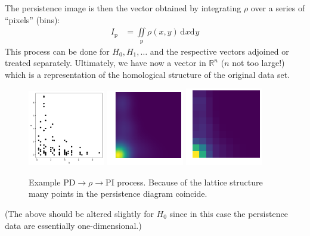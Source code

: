\documentclass[11pt]{article}
\renewcommand{\d}[2][]{\mathrm{d}^{#1}{#2}}
\begin{document}
The persistence image is then the vector obtained by integrating $\rho$ over a series of ``pixels'' (bins):
\begin{align}
    I_\text{p} &= \iint\limits_\text{p}\rho(x,y)\,\d{x}\d{y}
\end{align}
This process can be done for $H_0,H_1,\ldots$ and the respective vectors adjoined or treated separately. Ultimately, we have now a vector in $\mathbb{R}^n$ ($n$ not too large!) which is a representation of the homological structure of the original data set.

\begin{figure}[t]
    \centering
    \includegraphics[width=0.3\textwidth]{pd_example}
    \includegraphics[width=0.3\textwidth]{rho_example}
    \includegraphics[width=0.3\textwidth]{pi_example}
    \caption{Example PD$\rightarrow\rho\rightarrow$PI process. Because of the lattice structure many points in the persistence diagram coincide.}
\end{figure}

(The above should be altered slightly for $H_0$ since in this case the persistence data are essentially one-dimensional.)
\end{document}
